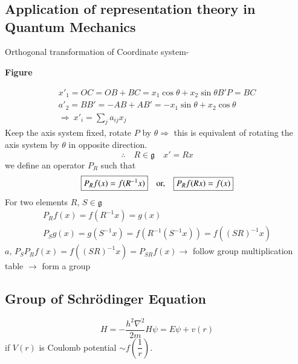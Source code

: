 \chapter{}\label{lec8}

\section*{Application of representation theory in Quantum Mechanics}

Orthogonal transformation of Coordinate system-
\begin{center}
{\bf Figure}
\end{center}
\begin{gather*}
x'_{1}=OC=OB+BC=x_{1}\cos \theta+x_{2}\sin\theta B'P=BC\\
a'_{2}=BB'=-AB+AB'=-x_{1}\sin\theta + x_{2}\cos \theta\\
\Rightarrow \ x'_{i}=\sum\limits_{j}a_{ij}x_{j}
\end{gather*}
Keep the axis system fixed, rotate $P$ by $\theta\Rightarrow$ this is equivalent of rotating the axis system by $\theta$ in opposite direction.
$$
\therefore\quad R\in \mathfrak{g}\quad x'=Rx
$$
we define an operator $P_{R}$ such that
$$
\fbox{$P_{R}f(x)=f(R^{-1}x)$}\quad\text{or,}\quad \fbox{$P_{R}f(Rx)=f(x)$}
$$
For two elements $R$, $S\in \mathfrak{g}$
\begin{gather*}
P_{R}f(x)=f(R^{-1}x)=g(x)\\
P_{S}g(x)=g(S^{-1}x)=f(R^{-1}(S^{-1}x))=f((SR)^{-1}x)
\end{gather*}
$a$, $P_{S}P_{R}f(x)=f((SR)^{-1}x)=P_{SR}f(x)\to$ follow group multiplication table $\to$ form a group

\section*{Group of Schr\"odinger Equation}
$$
H=-\dfrac{h^{2}\nabla^{2}}{2m}H\psi=E\psi+v(r)
$$
if $V(r)$ is Coulomb potential $\sim f\left(\dfrac{1}{r}\right)$.

